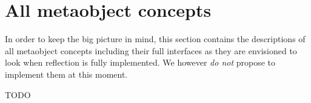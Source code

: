 \section{All metaobject concepts}
\label{section-all-Concepts}

In order to keep the big picture in mind, this section
contains the descriptions of all metaobject concepts
including their full interfaces as they are envisioned
to look when reflection is fully implemented. We
however {\em do not} propose to implement them at this moment.






TODO

%
%
%
%
%
%
%
%
%
%
%
%
%
%
%
%
%
%
%
%
%
%
